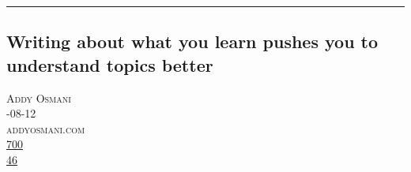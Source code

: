 \documentclass[10pt,a4paper]{article}
\begin{document}
\par\medskip
\noindent\textcolor{red}{\rule{\linewidth}{0.2mm}}

\subsection{Writing about what you learn pushes you to understand topics better}
\noindent\begin{minipage}[t]{0.20\linewidth}
\vspace{0pt}
\noindent\textsc{\footnotesize
{\scriptsize\faUser}\space 
Addy Osmani \\
{\scriptsize\faCalendar}-08-12 \\
{\scriptsize\faGlobe}\space 
addyosmani.com \\
{\scriptsize\faThumbsOUp}\space 
\href{http://news.ycombinator.com/item?id=37118883\&utm\_term=comment}{700} \\
{\scriptsize\faComments}\space 
\href{http://news.ycombinator.com/item?id=37118883\&utm\_term=comment}{46} \\
}
\end{minipage} %
\end{document}
